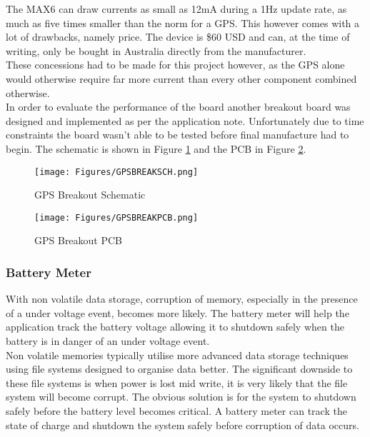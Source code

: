 \documentclass[12pt,openany,a4paper]{book}
\begin{document}
			The MAX6 can draw currents as small as 12mA during a 1Hz update rate, as much as five times smaller than the norm for a GPS. This however comes with a lot of drawbacks, namely price. The device is \$60 USD and can, at the time of writing, only be bought in Australia directly from the manufacturer. \\
			
			These concessions had to be made for this project however, as the GPS alone would otherwise require far more current than every other component combined otherwise. \\
			
			In order to evaluate the performance of the board another breakout board was designed and implemented as per the application note. Unfortunately due to time constraints the board wasn't able to be tested before final manufacture had to begin. The schematic is shown in Figure \ref{fig:GPSBREAKSCH} and the PCB in Figure \ref{fig:GPSBREAKPCB}.
			
			\begin{figure}[H]
				\centering
				\texttt{[image: Figures/GPSBREAKSCH.png]}
				\caption{GPS Breakout Schematic}
				\label{fig:GPSBREAKSCH}
			\end{figure}		
			
			\begin{figure}[H]
				\centering
				\texttt{[image: Figures/GPSBREAKPCB.png]}
				\caption{GPS Breakout PCB}
				\label{fig:GPSBREAKPCB}
			\end{figure}				
			
			\subsubsection{Battery Meter}
			With non volatile data storage, corruption of memory, especially in the presence of a under voltage event, becomes more likely. The battery meter will help the application track the battery voltage allowing it to shutdown safely when the battery is in danger of an under voltage event. \\
			
			Non volatile memories typically utilise more advanced data storage techniques using file systems designed to organise data better. The significant downside to these file systems is when power is lost mid write, it is very likely that the file system will become corrupt. The obvious solution is for the system to shutdown safely before the battery level becomes critical. A battery meter can track the state of charge and shutdown the system safely before corruption of data occurs. \\
			
\end{document}
